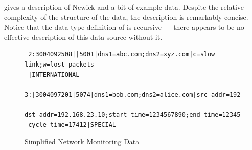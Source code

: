 \documentclass{entcs}
\begin{document}
 gives a description of Newick and a bit of example
data.  Despite the relative complexity of the structure of the data,
the description is remarkably concise.  Notice that the data type
definition of  is recursive --- there appears to be no
effective description of this data source without it.



\begin{figure}
  \centering
  \small
\begin{verbatim}
 2:3004092508||5001|dns1=abc.com;dns2=xyz.com|c=slow link;w=lost packets
 |INTERNATIONAL
 3:|3004097201|5074|dns1=bob.com;dns2=alice.com|src_addr=192.168.0.10;
 dst_addr=192.168.23.10;start_time=1234567890;end_time=1234568000;
 cycle_time=17412|SPECIAL
\end{verbatim}  
  \caption{Simplified Network Monitoring Data}
  \label{fig:darkstar-records}
\end{figure}
\end{document}
